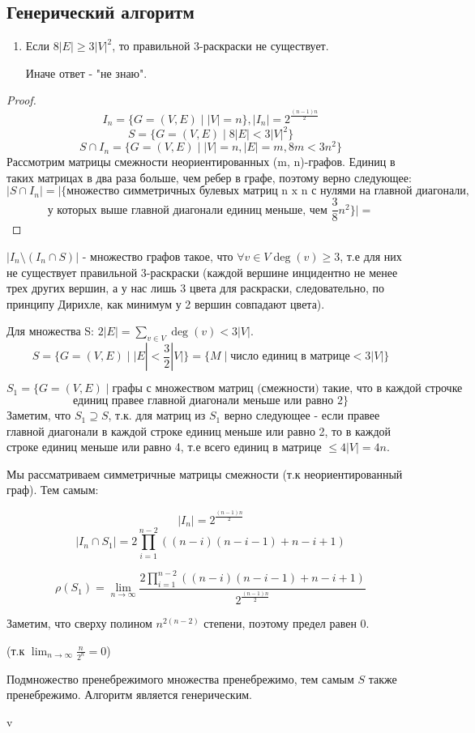 \documentclass[a4paper, 12pt]{article}
\theoremstyle{definition}
\theoremstyle{remark}
\DeclareMathOperator{\degg}{deg}
\begin{document}
\subsection*{Генерический алгоритм}
\begin{enumerate}
    \item Если $8|E| \geqslant 3{|V|}^2$, то правильной 3-раскраски не существует.

    Иначе ответ - "не знаю".

    
\end{enumerate}
\begin{proof}
    \[I_n = \{G = (V, E) \;| \;|V| = n\}, |I_n| = 2^{\frac{(n-1)n}{2}}\]
    \[S = \{G = (V, E) \;| \; 8|E| < 3{|V|}^2\}\]
    \[S \cap I_n = \{G = (V, E) \;| \;|V| = n, |E| = m, 8m < 3{n}^2\}\]
    Рассмотрим матрицы смежности неориентированных (m, n)-графов. Единиц в таких матрицах в два раза больше, чем ребер в графе, поэтому верно следующее:
    \[|S \cap I_n| = |\{\text{множество симметричных булевых матриц n x n с нулями на главной диагонали, }\]
    \[\text{у которых выше главной диагонали единиц меньше, чем }\frac38 n^2\}| = \]

\end{proof}
    $|I_n \setminus (I_n\cap S)|$ - множество графов такое, что $\forall v\in V \degg(v) \ge 3$, т.е для них не существует правильной 3-раскраски
    (каждой вершине инцидентно не менее трех других вершин, а у нас лишь 3 цвета для раскраски, следовательно, по принципу Дирихле,
    как минимум у 2 вершин совпадают цвета).

    Для множества S: $2|E| = \sum_{v\in V} \degg (v) < 3|V|$.
    \[S = \{G = (V, E) \;|\; |E| <\frac32 |V|\} = \{M \;|\; \text{число единиц в матрице} < 3|V|\}\]

    \[S_1 = \{G = (V, E) \;|\; \text{графы с множеством матриц (смежности) такие, что в каждой строчке}\]
    \[\text{единиц правее главной диагонали меньше или равно 2}\}\]
    Заметим, что $S_1 \supseteq S$, т.к. для матриц из $S_1$ верно следующее - если правее главной диагонали в каждой строке единиц меньше или равно 2, то в каждой строке единиц меньше или равно 4, т.е всего единиц в матрице $\le 4 |V| = 4n$.

    Мы рассматриваем симметричные матрицы смежности (т.к неориентированный граф). Тем самым:
    
    \[|I_n| = 2^{\frac{(n-1)n}{2}}\]
    \[|I_n\cap S_1| = 2\prod_{i=1}^{n-2} ((n-i)(n-i-1) + n - i +1)\]

    \[ \rho (S_1) = \lim_{n\to \infty} \frac{2\prod_{i=1}^{n-2}((n-i)(n-i-1) + n - i +1)}{2^{\frac{(n-1)n}{2}}}\]

    Заметим, что сверху полином $n^{2(n-2)}$ степени, поэтому предел равен 0.

    (т.к $\lim_{n\to \infty}\frac{n}{2^n} = 0$)

    Подмножество пренебрежимого множества пренебрежимо, тем самым $S$ также пренебрежимо. Алгоритм является генерическим.

    v
\end{document}
